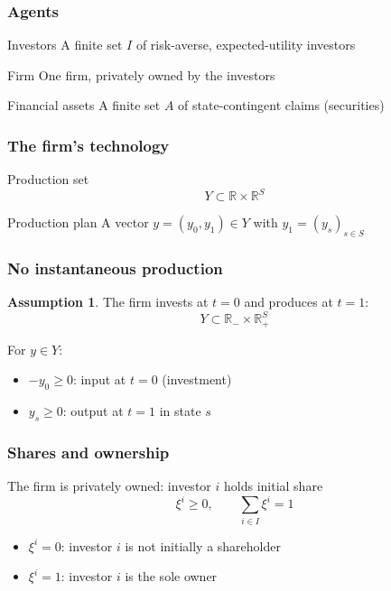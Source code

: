 \documentclass[blue]{beamer}
\def\R{\mathbb{R}}
\def\geq{\geqslant}
\theoremstyle{definition}
\newtheorem*{assumption}{Assumption}
\theoremstyle{example}
\begin{document}
\begin{frame}\frametitle{Agents}
\begin{block}{Investors}
A finite set $I$ of risk-averse, expected-utility investors
\end{block}
\begin{block}{Firm}
One firm, privately owned by the investors
\end{block}
\begin{block}{Financial assets}
A finite set $A$ of state-contingent claims (securities)
\end{block}
\end{frame}

\begin{frame}\frametitle{The firm's technology}
\begin{block}{Production set}
\begin{equation*}
Y \subset \R \times \R^{S}
\end{equation*}
\end{block}
\begin{block}{Production plan}
A vector $y = (y_0, y_1) \in Y$ with $y_1 = (y_s)_{s \in S}$
\end{block}
\end{frame}

\begin{frame}\frametitle{No instantaneous production}
\begin{assumption}
The firm invests at $t=0$ and produces at $t=1$:
\begin{equation*}
Y \subset \R_{-} \times \R^{S}_{+}
\end{equation*}
\end{assumption}
\bigskip

For $y \in Y$:
\begin{itemize}
\item $-y_0 \geq 0$: input at $t=0$ (investment)
\item $y_s \geq 0$: output at $t=1$ in state $s$
\end{itemize}
\end{frame}

\begin{frame}\frametitle{Shares and ownership}
The firm is privately owned: investor $i$ holds initial share
\begin{equation*}
\xi^i \geq 0,
\qquad
\sum_{i \in I} \xi^i = 1
\end{equation*}

\begin{itemize}
\item $\xi^i = 0$: investor $i$ is not initially a shareholder
\item $\xi^i = 1$: investor $i$ is the sole owner
\end{itemize}
\end{frame}
\end{document}
